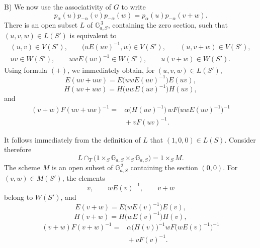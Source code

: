\textup{B)} We now use the associativity of \(G\) to write
\[
  p_\alpha(u)p_{-\alpha}(v)p_{-\alpha}(w)
    =p_\alpha(u)p_{-\alpha}(v+w).
\]
There is an open subset \(L\) of
\(\mathbb G_{a,S}^{\,3}\), containing the zero section, such that
\((u,v,w)\in L(S')\) is equivalent to
\[
\begin{gathered}
  (u,v)\in V(S'),\qquad
  \bigl(uE(uv)^{-1},w\bigr)\in V(S'),\qquad
  (u,v+w)\in V(S'),\\
  uv\in W(S'),\qquad
  uwE(uv)^{-1}\in W(S'),\qquad
  u(v+w)\in W(S').
\end{gathered}
\]
Using formula \((+)\), we immediately obtain, for
\((u,v,w)\in L(S')\),
\begin{equation}\tag{1}
  E(uv+uw)=E\bigl(uwE(uv)^{-1}\bigr)E(uv),
\end{equation}
\begin{equation}\tag{2}
  H(uv+uw)=H\bigl(uwE(uv)^{-1}\bigr)H(uv),
\end{equation}
and
\begin{equation}\tag{3}
\begin{split}
  (v+w)F(uv+uw)^{-1}
   ={}&\alpha\bigl(H(uv)^{-1}\bigr)\,
        wF\bigl(uwE(uv)^{-1}\bigr)^{-1}\\
     &{}+vF(uv)^{-1}.
\end{split}
\end{equation}

It follows immediately from the definition of \(L\) that
\((1,0,0)\in L(S)\). Consider therefore
\[
  L\cap_T
    \bigl(1\times_S\mathbb G_{a,S}\times_S\mathbb G_{a,S}\bigr)
      =1\times_S M.
\]
The scheme \(M\) is an open subset of
\(\mathbb G_{a,S}^{\,2}\) containing the section \((0,0)\).
For \((v,w)\in M(S')\), the elements
\[
  v,\qquad wE(v)^{-1},\qquad v+w
\]
belong to \(W(S')\), and
\begin{equation}\tag{1'}
  E(v+w)=E\bigl(wE(v)^{-1}\bigr)E(v),
\end{equation}
\begin{equation}\tag{2'}
  H(v+w)=H\bigl(wE(v)^{-1}\bigr)H(v),
\end{equation}
\begin{equation}\tag{3'}
\begin{split}
  (v+w)F(v+w)^{-1}
   ={}&\alpha\bigl(H(v)\bigr)^{-1}
        wF\bigl(wE(v)^{-1}\bigr)^{-1}\\
     &{}+vF(v)^{-1}.
\end{split}
\end{equation}

